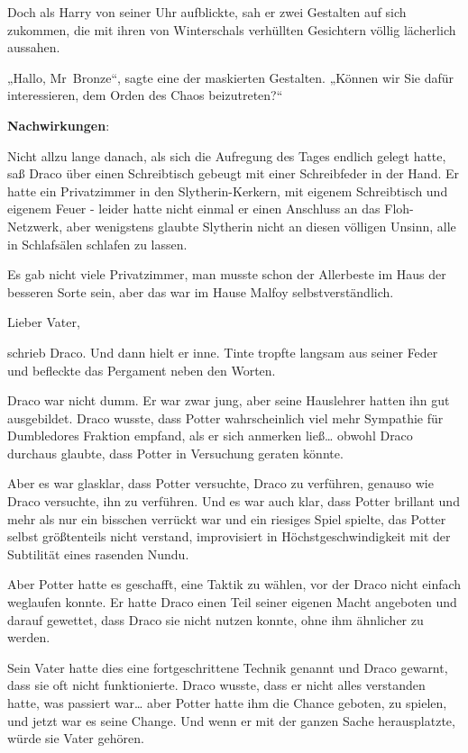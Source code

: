 {Doch als Harry von seiner Uhr aufblickte, sah er zwei Gestalten auf sich zukommen, die mit ihren von Winterschals verhüllten Gesichtern völlig lächerlich aussahen.

„Hallo, Mr~Bronze“, sagte eine der maskierten Gestalten. „Können wir Sie dafür interessieren, dem Orden des Chaos beizutreten?“

\textbf{Nachwirkungen}:

Nicht allzu lange danach, als sich die Aufregung des Tages endlich gelegt hatte, saß Draco über einen Schreibtisch gebeugt mit einer Schreibfeder in der Hand. Er hatte ein Privatzimmer in den Slytherin-Kerkern, mit eigenem Schreibtisch und eigenem Feuer - leider hatte nicht einmal er einen Anschluss an das Floh-Netzwerk, aber wenigstens glaubte Slytherin nicht an diesen völligen Unsinn, alle in Schlafsälen schlafen zu lassen.

Es gab nicht viele Privatzimmer, man musste schon der Allerbeste im Haus der besseren Sorte sein, aber das war im Hause Malfoy selbstverständlich.

Lieber Vater,

schrieb Draco. Und dann hielt er inne. Tinte tropfte langsam aus seiner Feder und befleckte das Pergament neben den Worten.

Draco war nicht dumm. Er war zwar jung, aber seine Hauslehrer hatten ihn gut ausgebildet. Draco wusste, dass Potter wahrscheinlich viel mehr Sympathie für Dumbledores Fraktion empfand, als er sich anmerken ließ… obwohl Draco durchaus glaubte, dass Potter in Versuchung geraten könnte.

Aber es war glasklar, dass Potter versuchte, Draco zu verführen, genauso wie Draco versuchte, ihn zu verführen. Und es war auch klar, dass Potter brillant und mehr als nur ein bisschen verrückt war und ein riesiges Spiel spielte, das Potter selbst größtenteils nicht verstand, improvisiert in Höchstgeschwindigkeit mit der Subtilität eines rasenden Nundu.

Aber Potter hatte es geschafft, eine Taktik zu wählen, vor der Draco nicht einfach weglaufen konnte. Er hatte Draco einen Teil seiner eigenen Macht angeboten und darauf gewettet, dass Draco sie nicht nutzen konnte, ohne ihm ähnlicher zu werden.

Sein Vater hatte dies eine fortgeschrittene Technik genannt und Draco gewarnt, dass sie oft nicht funktionierte. Draco wusste, dass er nicht alles verstanden hatte, was passiert war… aber Potter hatte ihm die Chance geboten, zu spielen, und jetzt war es seine Change. Und wenn er mit der ganzen Sache herausplatzte, würde sie Vater gehören.

}
